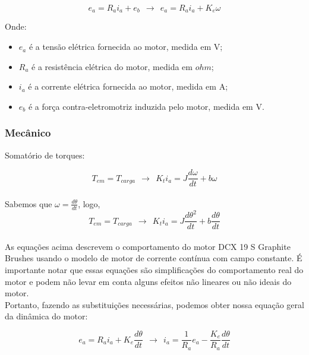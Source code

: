 \documentclass[a4paper, 12pt]{article}
\begin{document}
\begin{equation}
    e_{a} = R_a i_a + e_{b} \>\ \longrightarrow \>\   e_{a} = R_a i_a + K_e \omega
\end{equation}


Onde:\\
\begin{itemize}
    \item $e_{a}$ é a tensão elétrica fornecida ao motor, medida em V;
    \item $R_a$ é a resistência elétrica do motor, medida em $ohm$;
    \item $i_a$ é a corrente elétrica fornecida ao motor, medida em A;
    \item $e_{b}$ é a força contra-eletromotriz induzida pelo motor, medida em V.
\end{itemize}

\subsubsection{Mecânico}

Somatório de torques:

\begin{equation}
    T_{em} =  T_{carga} \>\ \longrightarrow \>\ K_t i_a = J \frac{d\omega}{dt} + b \omega
\end{equation} \\

Sabemos que $\omega = \frac{d\theta}{dt}$, logo, \\

\begin{equation}
    T_{em} =  T_{carga} \>\ \longrightarrow \>\ K_t i_a = J \frac{d \theta^2}{dt} + b \frac{d\theta}{dt}
\end{equation} \\

As equações acima descrevem o comportamento do motor DCX 19 S Graphite Brushes usando o modelo de motor de corrente contínua com campo constante. É importante notar que essas equações são simplificações do comportamento real do motor e podem não levar em conta alguns efeitos não lineares ou não ideais do motor.\\

Portanto, fazendo as substituições necessárias, podemos obter nossa equação geral da dinâmica do motor:

\begin{equation}
    e_{a} = R_a i_a + K_e \frac{d\theta}{dt} \>\ \longrightarrow \>\ i_a = \frac{1}{R_a}e_a - \frac{K_e}{R_a} \frac{d\theta}{dt}
\end{equation}
\end{document}
